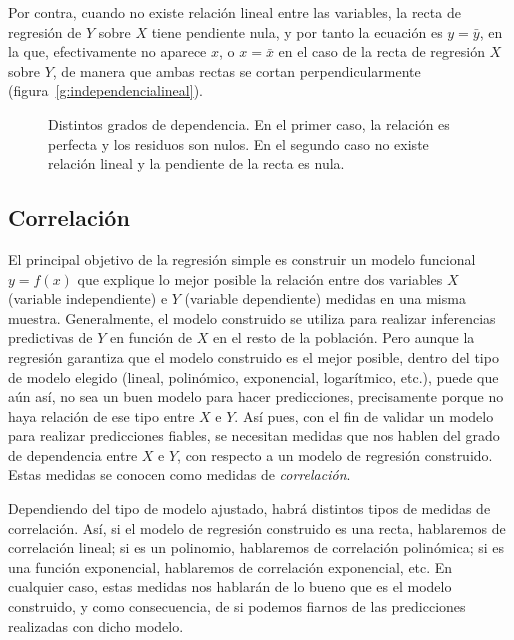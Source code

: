 Por contra, cuando no existe relación lineal entre las variables, la recta de regresión de $Y$ sobre $X$ tiene pendiente
nula, y por tanto la ecuación es $y=\bar y$, en la que, efectivamente no aparece $x$, o $x=\bar x$ en el caso de la
recta de regresión $X$ sobre $Y$, de manera que ambas rectas se cortan perpendicularmente
(figura~\ref{g:independencialineal}).

\begin{figure}[htbp]
\centering 
{}\qquad
{}
\caption{Distintos grados de dependencia. En el primer caso, la relación es perfecta
y los residuos son nulos. En el segundo caso no existe relación lineal y la
pendiente de la recta es nula.}
\end{figure}


\subsection{Correlación}
El principal objetivo de la regresión simple es construir un modelo funcional $y=f(x)$ que explique lo mejor posible la
relación entre dos variables $X$ (variable independiente) e $Y$ (variable dependiente) medidas en una misma muestra.
Generalmente, el modelo construido se utiliza para realizar inferencias predictivas de $Y$ en función de $X$ en el resto
de la población.
Pero aunque la regresión garantiza que el modelo construido es el mejor posible, dentro del tipo de modelo elegido
(lineal, polinómico, exponencial, logarítmico, etc.), puede que aún así, no sea un buen modelo para hacer predicciones,
precisamente porque no haya relación de ese tipo entre $X$ e $Y$.
Así pues, con el fin de validar un modelo para realizar predicciones fiables, se necesitan medidas que nos hablen del
grado de dependencia entre $X$ e $Y$, con respecto a un modelo de regresión construido. Estas medidas se conocen como
medidas de \emph{correlación}.

Dependiendo del tipo de modelo ajustado, habrá distintos tipos de medidas de correlación.
Así, si el modelo de regresión construido es una recta, hablaremos de correlación lineal; si es un polinomio, hablaremos
de correlación polinómica; si es una función exponencial, hablaremos de correlación exponencial, etc.
En cualquier caso, estas medidas nos hablarán de lo bueno que es el modelo construido, y como consecuencia, de si
podemos fiarnos de las predicciones realizadas con dicho modelo.

